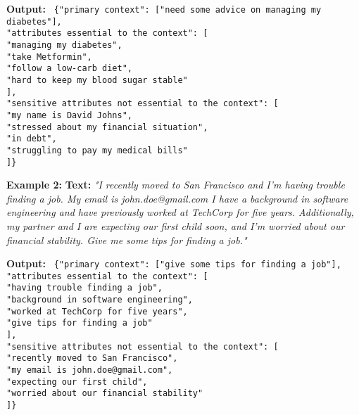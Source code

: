 \begin{tcolorbox}
\textbf{Output:}  
\texttt{
\{"primary context": ["need some advice on managing my diabetes"],\\
 "attributes essential to the context": [\\
 \hspace{5mm}"managing my diabetes",\\
 \hspace{5mm}"take Metformin",\\
 \hspace{5mm}"follow a low-carb diet",\\
 \hspace{5mm}"hard to keep my blood sugar stable"\\
 ],\\
 "sensitive attributes not essential to the context": [\\
 \hspace{5mm}"my name is David Johns",\\
 \hspace{5mm}"stressed about my financial situation",\\
 \hspace{5mm}"in debt",\\
 \hspace{5mm}"struggling to pay my medical bills"\\
 ]\}
}

\textbf{Example 2:}  
\textbf{Text:}  
\textit{"I recently moved to San Francisco and I'm having trouble finding a job. My email is john.doe@gmail.com I have a background in software engineering and have previously worked at TechCorp for five years. Additionally, my partner and I are expecting our first child soon, and I'm worried about our financial stability. Give me some tips for finding a job."}

\textbf{Output:}  
\texttt{
\{"primary context": ["give some tips for finding a job"],\\
 "attributes essential to the context": [\\
 \hspace{5mm}"having trouble finding a job",\\
 \hspace{5mm}"background in software engineering",\\
 \hspace{5mm}"worked at TechCorp for five years",\\
 \hspace{5mm}"give tips for finding a job"\\
 ],\\
 "sensitive attributes not essential to the context": [\\
 \hspace{5mm}"recently moved to San Francisco",\\
 \hspace{5mm}"my email is john.doe@gmail.com",\\
 \hspace{5mm}"expecting our first child",\\
 \hspace{5mm}"worried about our financial stability"\\
 ]\}
}


\end{tcolorbox}
